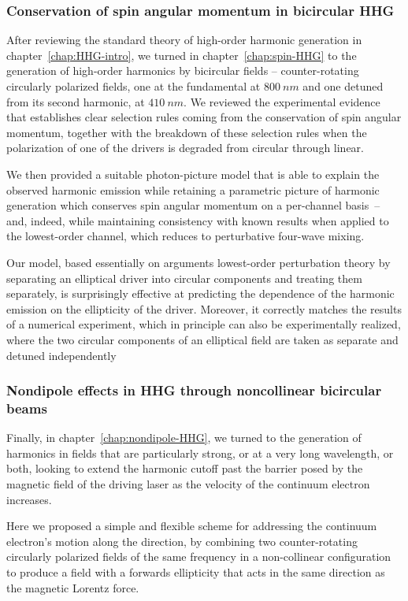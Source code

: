 \subsubsection{Conservation of spin angular momentum in bicircular HHG}
After reviewing the standard theory of high-order harmonic generation in chapter~\ref{chap:HHG-intro}, we turned in chapter~\ref{chap:spin-HHG} to the generation of high-order harmonics by bicircular fields -- counter-rotating circularly polarized fields, one at the fundamental at $\SI{800}{nm}$ and one detuned from its second harmonic, at $\SI{410}{nm}$. We reviewed the experimental evidence that establishes clear selection rules coming from the conservation of spin angular momentum, together with the breakdown of these selection rules when the polarization of one of the drivers is degraded from circular through linear.

We then provided a suitable photon-picture model that is able to explain the observed harmonic emission while retaining a parametric picture of harmonic generation which conserves spin angular momentum on a per-channel basis~-- and, indeed, while maintaining consistency with known results when applied to the lowest-order channel, which reduces to perturbative four-wave mixing. 

Our model, based essentially on arguments lowest-order perturbation theory by separating an elliptical driver into circular components and treating them separately, is surprisingly effective at predicting the dependence of the harmonic emission on the ellipticity of the driver. Moreover, it correctly matches the results of a numerical experiment, which in principle can also be experimentally realized, where the two circular components of an elliptical field are taken as separate and detuned independently



\subsubsection{Nondipole effects in HHG through noncollinear bicircular beams}
Finally, in chapter~\ref{chap:nondipole-HHG}, we turned to the generation of harmonics in fields that are particularly strong, or at a very long wavelength, or both, looking to extend the harmonic cutoff past the barrier posed by the magnetic field of the driving laser as the velocity of the continuum electron increases.

Here we proposed a simple and flexible scheme for addressing the continuum electron's motion along the direction, by combining two counter-rotating circularly polarized fields of the same frequency in a non-collinear configuration to produce a field with a forwards ellipticity that acts in the same direction as the magnetic Lorentz force.

